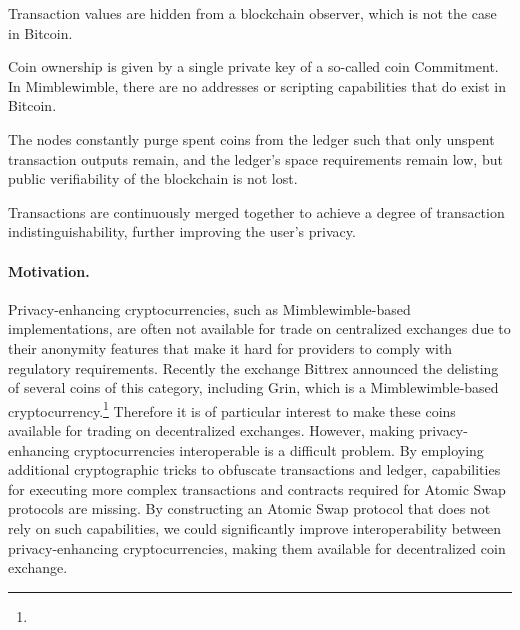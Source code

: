 \begin{asparaitem}
    \item Transaction values are hidden from a blockchain observer, which is not the case in Bitcoin.
    \item Coin ownership is given by a single private key of a so-called coin Commitment.
    In Mimblewimble, there are no addresses or scripting capabilities that do exist in Bitcoin.
    \item The nodes constantly purge spent coins from the ledger such that only unspent transaction outputs remain, and the ledger's space requirements remain low, but public verifiability of the blockchain is not lost.
    \item Transactions are continuously merged together to achieve a degree of transaction indistinguishability, further improving the user's privacy.
\end{asparaitem}

\paragraph{Motivation.}
Privacy-enhancing cryptocurrencies, such as Mimblewimble-based implementations, are often not available for trade on centralized exchanges due to their anonymity features that make it hard for providers to comply with regulatory requirements.
Recently the exchange Bittrex announced the delisting of several coins of this category, including Grin, which is a Mimblewimble-based cryptocurrency.\footnote{\urldelist}
Therefore it is of particular interest to make these coins available for trading on decentralized exchanges.
However, making privacy-enhancing cryptocurrencies interoperable is a difficult problem.
By employing additional cryptographic tricks to obfuscate transactions and ledger, capabilities for executing more complex transactions and contracts required for Atomic Swap protocols are missing.
By constructing an Atomic Swap protocol that does not rely on such capabilities, we could significantly improve interoperability between privacy-enhancing cryptocurrencies, making them available for decentralized coin exchange.

